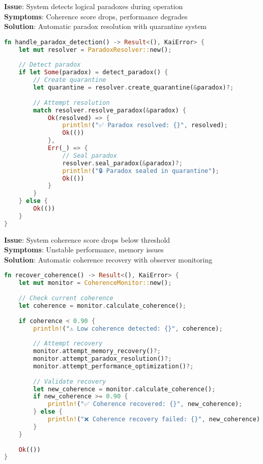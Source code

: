 \documentclass[11pt]{report}
\newcommand{\codebox}[2]{
  \begin{tcolorbox}[
    colback=gray!5,
    colframe=kai_blue,
    title=#1,
    fonttitle=\bfseries
  ]
  #2
  \end{tcolorbox}
}
\newcommand{\paradoxbox}[2]{
  \begin{tcolorbox}[
    colback=red!5,
    colframe=kai_red,
    title=#1,
    fonttitle=\bfseries
  ]
  #2
  \end{tcolorbox}
}
\newcommand{\observerbox}[2]{
  \begin{tcolorbox}[
    colback=green!5,
    colframe=kai_green,
    title=#1,
    fonttitle=\bfseries
  ]
  #2
  \end{tcolorbox}
}
\begin{document}
\paradoxbox{Paradox Detection}{
\textbf{Issue}: System detects logical paradoxes during operation\\
\textbf{Symptoms}: Coherence score drops, performance degrades\\
\textbf{Solution}: Automatic paradox resolution with quarantine system
}

\codebox{Paradox Recovery}{
\begin{lstlisting}[language=rust]
fn handle_paradox_detection() -> Result<(), KaiError> {
    let mut resolver = ParadoxResolver::new();
    
    // Detect paradox
    if let Some(paradox) = detect_paradox() {
        // Create quarantine
        let quarantine = resolver.create_quarantine(&paradox)?;
        
        // Attempt resolution
        match resolver.resolve_paradox(&paradox) {
            Ok(resolved) => {
                println!("✅ Paradox resolved: {}", resolved);
                Ok(())
            },
            Err(_) => {
                // Seal paradox
                resolver.seal_paradox(&paradox)?;
                println!("🔒 Paradox sealed in quarantine");
                Ok(())
            }
        }
    } else {
        Ok(())
    }
}
\end{lstlisting}
}

\observerbox{Coherence Recovery}{
\textbf{Issue}: System coherence score drops below threshold\\
\textbf{Symptoms}: Unstable performance, memory issues\\
\textbf{Solution}: Automatic coherence recovery with observer monitoring
}

\codebox{Coherence Recovery}{
\begin{lstlisting}[language=rust]
fn recover_coherence() -> Result<(), KaiError> {
    let mut monitor = CoherenceMonitor::new();
    
    // Check current coherence
    let coherence = monitor.calculate_coherence();
    
    if coherence < 0.90 {
        println!("⚠️ Low coherence detected: {}", coherence);
        
        // Attempt recovery
        monitor.attempt_memory_recovery()?;
        monitor.attempt_paradox_resolution()?;
        monitor.attempt_performance_optimization()?;
        
        // Validate recovery
        let new_coherence = monitor.calculate_coherence();
        if new_coherence >= 0.90 {
            println!("✅ Coherence recovered: {}", new_coherence);
        } else {
            println!("❌ Coherence recovery failed: {}", new_coherence);
        }
    }
    
    Ok(())
}
\end{lstlisting}
}
\end{document}
